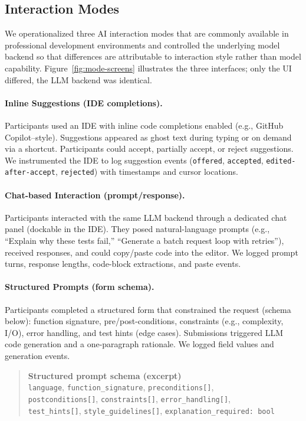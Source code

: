 \documentclass[sigconf]{acmart}
\begin{document}
\subsection{Interaction Modes}
\label{sec:conditions}

We operationalized three AI interaction modes that are commonly available in professional development environments and controlled the underlying model backend so that differences are attributable to interaction style rather than model capability. Figure~\ref{fig:mode-screens} illustrates the three interfaces; only the UI differed, the LLM backend was identical.


\paragraph{Inline Suggestions (IDE completions).}
Participants used an IDE with inline code completions enabled (e.g., GitHub Copilot–style). Suggestions appeared as ghost text during typing or on demand via a shortcut. Participants could accept, partially accept, or reject suggestions. We instrumented the IDE to log suggestion events (\texttt{offered}, \texttt{accepted}, \texttt{edited-after-accept}, \texttt{rejected}) with timestamps and cursor locations.

\paragraph{Chat-based Interaction (prompt/response).}
Participants interacted with the same LLM backend through a dedicated chat panel (dockable in the IDE). They posed natural-language prompts (e.g., “Explain why these tests fail,” “Generate a batch request loop with retries”), received responses, and could copy/paste code into the editor. We logged prompt turns, response lengths, code-block extractions, and paste events.

\paragraph{Structured Prompts (form schema).}
Participants completed a structured form that constrained the request (schema below): function signature, pre/post-conditions, constraints (e.g., complexity, I/O), error handling, and test hints (edge cases). Submissions triggered LLM code generation and a one-paragraph rationale. We logged field values and generation events.

\begin{quote}
\small
\textbf{Structured prompt schema (excerpt)}\\
\texttt{language}, \texttt{function\_signature}, \texttt{preconditions[]}, \\ \texttt{postconditions[]}, \texttt{constraints[]}, \texttt{error\_handling[]}, \\ \texttt{test\_hints[]}, \texttt{style\_guidelines[]}, \texttt{explanation\_required: bool}
\end{quote}
\end{document}
